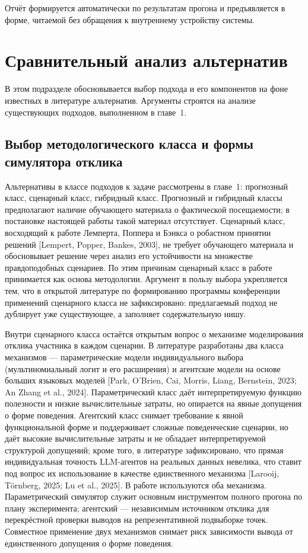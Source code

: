 Отчёт формируется автоматически по результатам прогона и предъявляется в форме, читаемой без обращения к внутреннему устройству системы.


\section{Сравнительный анализ альтернатив}

В этом подразделе обосновывается выбор подхода и его компонентов на фоне известных в литературе альтернатив. Аргументы строятся на анализе существующих подходов, выполненном в главе~1.


\subsection{Выбор методологического класса и формы симулятора отклика}

Альтернативы в классе подходов к задаче рассмотрены в главе~1: прогнозный класс, сценарный класс, гибридный класс. Прогнозный и гибридный классы предполагают наличие обучающего материала о фактической посещаемости; в постановке настоящей работы такой материал отсутствует. Сценарный класс, восходящий к работе Лемперта, Поппера и Бэнкса о робастном принятии решений [Lempert, Popper, Bankes, 2003], не требует обучающего материала и обосновывает решение через анализ его устойчивости на множестве правдоподобных сценариев. По этим причинам сценарный класс в работе принимается как основа методологии. Аргумент в пользу выбора укрепляется тем, что в открытой литературе по формированию программы конференции применений сценарного класса не зафиксировано: предлагаемый подход не дублирует уже существующее, а заполняет содержательную нишу.

Внутри сценарного класса остаётся открытым вопрос о механизме моделирования отклика участника в каждом сценарии. В литературе разработаны два класса механизмов --- параметрические модели индивидуального выбора (мультиномиальный логит и его расширения) и агентские модели на основе больших языковых моделей [Park, O'Brien, Cai, Morris, Liang, Bernstein, 2023; An Zhang et al., 2024]. Параметрический класс даёт интерпретируемую функцию полезности и низкие вычислительные затраты, но опирается на явные допущения о форме поведения. Агентский класс снимает требование к явной функциональной форме и поддерживает сложные поведенческие сценарии, но даёт высокие вычислительные затраты и не обладает интерпретируемой структурой допущений; кроме того, в литературе зафиксировано, что прямая индивидуальная точность LLM-агентов на реальных данных невелика, что ставит под вопрос их использование в качестве единственного механизма [Larooij, Törnberg, 2025; Lu et al., 2025]. В работе используются оба механизма. Параметрический симулятор служит основным инструментом полного прогона по плану эксперимента; агентский --- независимым источником отклика для перекрёстной проверки выводов на репрезентативной подвыборке точек. Совместное применение двух механизмов снимает риск зависимости вывода от единственного допущения о форме поведения.


